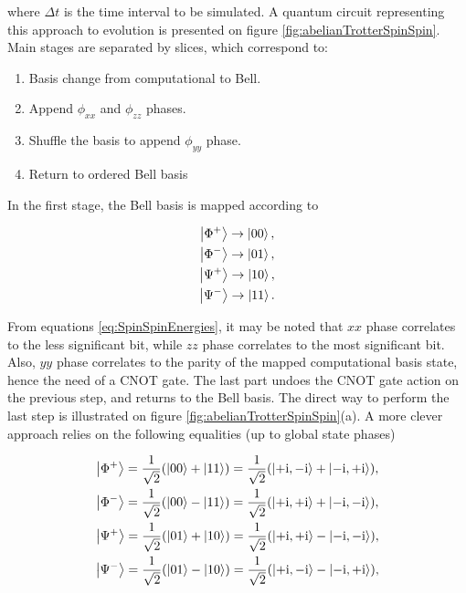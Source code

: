       \noindent where $\Delta t$ is the time interval to be simulated. A quantum circuit representing this approach to evolution is presented on figure \ref{fig:abelianTrotterSpinSpin}. Main stages are separated by slices, which correspond to:

      \begin{enumerate}
        \item Basis change from computational to Bell.
        \item Append $\phi_{xx}$ and $\phi_{zz}$ phases.
        \item Shuffle the basis to append $\phi_{yy}$ phase.
        \item Return to ordered Bell basis
      \end{enumerate}

      In the first stage, the Bell basis is mapped according to

      \begin{gather}
        \ket{\Phi^{+}} \rightarrow \ket{00}, \\
        \ket{\Phi^{-}} \rightarrow \ket{01}, \\
        \ket{\Psi^{+}} \rightarrow \ket{10}, \\
        \ket{\Psi^{-}} \rightarrow \ket{11}. 
      \end{gather}

      From equations \ref{eq:SpinSpinEnergies}, it may be noted that $xx$ phase correlates to the less significant bit, while $zz$ phase correlates to the most significant bit. Also, $yy$ phase correlates to the parity of the mapped computational basis state, hence the need of a CNOT gate. The last part undoes the CNOT gate action on the previous step, and returns to the Bell basis. The direct way to perform the last step is illustrated on figure \ref{fig:abelianTrotterSpinSpin}(a). A more clever approach relies on the following equalities (up to global state phases)

      \begin{gather}
        \ket{\Phi^{+}} = \frac{1}{\sqrt{2}}(\ket{00} + \ket{11}) = \frac{1}{\sqrt{2}}(\ket{+\mathrm{i},-\mathrm{i}} + \ket{-\mathrm{i},+\mathrm{i}}), \\
        \ket{\Phi^{-}} = \frac{1}{\sqrt{2}}(\ket{00} - \ket{11}) = \frac{1}{\sqrt{2}}(\ket{+\mathrm{i},+\mathrm{i}} + \ket{-\mathrm{i},-\mathrm{i}}), \\
        \ket{\Psi^{+}} = \frac{1}{\sqrt{2}}(\ket{01} + \ket{10}) = \frac{1}{\sqrt{2}}(\ket{+\mathrm{i},+\mathrm{i}} - \ket{-\mathrm{i},-\mathrm{i}}), \\
        \ket{\Psi^{-}} = \frac{1}{\sqrt{2}}(\ket{01} - \ket{10}) = \frac{1}{\sqrt{2}}(\ket{+\mathrm{i},-\mathrm{i}} - \ket{-\mathrm{i},+\mathrm{i}}), 
        \label{eq:bellOnYBasis}
      \end{gather}

